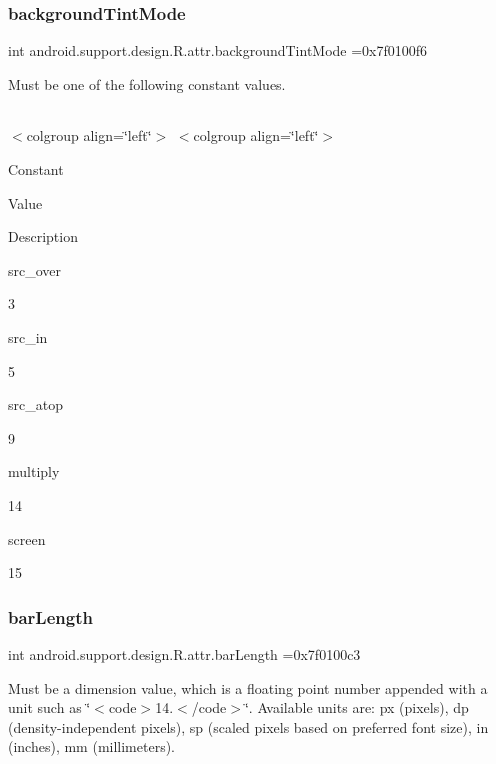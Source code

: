\subsubsection{\texorpdfstring{background\+Tint\+Mode}{backgroundTintMode}}
{\footnotesize\ttfamily int android.\+support.\+design.\+R.\+attr.\+background\+Tint\+Mode =0x7f0100f6\hspace{0.3cm}{\ttfamily [static]}}

Must be one of the following constant values.

\tabulinesep=1mm
\begin{longtabu} spread 0pt [c]{*{0}{|X[-1]}|}
\hline
\end{longtabu}
$<$colgroup align=\char`\"{}left\char`\"{}$>$ $<$colgroup align=\char`\"{}left\char`\"{}$>$ 

Constant

Value

Description 

{\ttfamily src\+\_\+over}

3

{\ttfamily src\+\_\+in}

5

{\ttfamily src\+\_\+atop}

9

{\ttfamily multiply}

14

{\ttfamily screen}

15\mbox{\label{classandroid_1_1support_1_1design_1_1R_1_1attr_a38fc388c8d6cd00ce22d642ef15bb9b2}} 
\subsubsection{\texorpdfstring{bar\+Length}{barLength}}
{\footnotesize\ttfamily int android.\+support.\+design.\+R.\+attr.\+bar\+Length =0x7f0100c3\hspace{0.3cm}{\ttfamily [static]}}

Must be a dimension value, which is a floating point number appended with a unit such as \char`\"{}$<$code$>$14.\+5sp$<$/code$>$\char`\"{}. Available units are\+: px (pixels), dp (density-\/independent pixels), sp (scaled pixels based on preferred font size), in (inches), mm (millimeters). 

